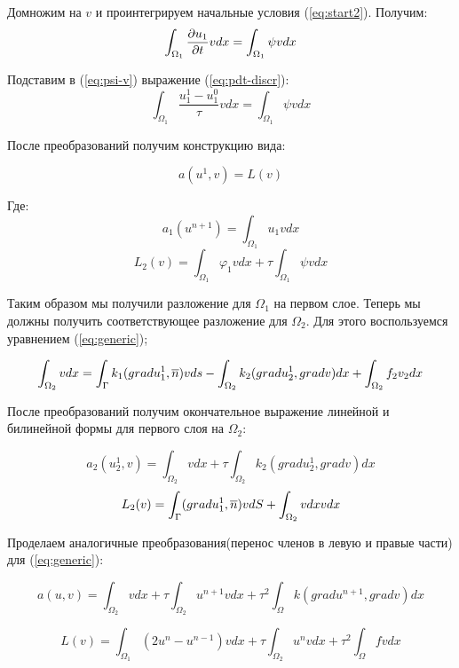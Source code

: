 Домножим на $v$ и проинтегрируем начальные условия (\ref{eq:start2}). Получим:
\begin{equation}
    \int_{\Omega_1}{\frac{\partial u_1}{\partial t}}vdx = \int_{\Omega_1}\psi vdx
    \label{eq:psi-v}
\end{equation}

Подставим в (\ref{eq:psi-v}) выражение (\ref{eq:pdt-discr}):
$$\int_{\Omega_1} \frac{u_1^1-u_1^0}{\tau}vdx = \int_{\Omega_1}\psi vdx $$

После преобразований получим конструкцию вида:

\begin{equation}
     a(u^{1}, v) = L(v) 
     \label{eq:al-first-layer}
\end{equation}


Где:
$$ a_1(u^{n + 1}) = \int_{\Omega_1}u_1vdx $$
$$ L_2(v) = \int_{\Omega_1}\varphi_1 vdx + \tau\int_{\Omega_1}\psi vdx $$


Таким образом мы получили разложение для $\Omega_1$ на первом слое. Теперь мы должны получить соответствующее разложение для $\Omega_2$. Для этого воспользуемся уравнением (\ref{eq:generic});

$$ \int_{\Omega_2}vdx = \int_{\Gamma}k_1(gradu_1^1, \overline{n})vds - \int_{\Omega_2}k_2(gradu_2^1, gradv)dx + \int_{\Omega_2}f_2v_2dx $$

После преобразований получим окончательное выражение линейной и билинейной формы для первого слоя на $\Omega_2$:

$$ a_2(u_2^1, v) = \int_{\Omega_2}vdx + \tau\int_{\Omega_2}^{}k_2(gradu_2^1, gradv)dx $$
$$ L_2(v) = \int_{\Gamma}(gradu_1^1, \overline{n})vdS + \int_{\Omega_2}^{}vdx vdx$$

Проделаем аналогичные преобразования(перенос членов в левую и правые части) для (\ref{eq:generic}):

\begin{equation}
    a(u, v) = \int_{\Omega_2}^{}vdx + \tau\int_{\Omega_2}^{}u^{n+1}vdx + \tau^2\int_{\Omega}^{}k(gradu^{n+1}, gradv)dx
    \label{eq:a-variational-generic}
\end{equation}

\begin{equation}
    L(v) = \int_{\Omega_1}^{}(2u^n - u^{n-1})vdx + \tau\int_{\Omega_2}^{}u^nvdx + \tau^2\int_{\Omega}^{}fvdx   
    \label{}
\end{equation}
